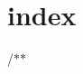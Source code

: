 \chapter{index }
\hypertarget{md_docs_2zh_2md_2rendering_2index}{}\label{md_docs_2zh_2md_2rendering_2index}
/\texorpdfstring{$\ast$}{*}\texorpdfstring{$\ast$}{*}
\begin{DoxyItemize}
\item 
\end{DoxyItemize}
